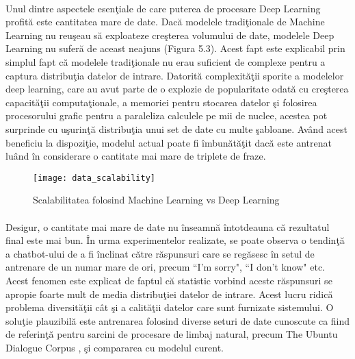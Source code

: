 \paragraph{}
Unul dintre aspectele esen\c tiale de care puterea de procesare Deep Learning profit\u a este cantitatea mare de date. Dac\u a modelele tradi\c tionale de Machine Learning nu reu\c seau s\u a exploateze cre\c sterea volumului de date, modelele Deep Learning nu sufer\u a de aceast neajuns (Figura 5.3). Acest fapt este explicabil prin simplul fapt c\u a modelele tradi\c tionale nu erau suficient de complexe pentru a captura distribu\c tia datelor de intrare. Datorit\u a complexit\u a\c tii sporite a modelelor deep learning, care au avut parte de o explozie de popularitate odat\u a cu cre\c sterea capacit\u a\c tii computa\c tionale, a memoriei pentru stocarea datelor \c si folosirea procesorului grafic pentru a paraleliza calculele pe mii de nuclee, acestea pot surprinde cu u\c surin\c t\u a distribu\c tia unui set de date cu multe \c sabloane. Av\^ and acest beneficiu la dispozi\c tie, modelul actual poate fi \^ imbun\u at\u a\c tit dac\u a este antrenat lu\^ and \^ in considerare o cantitate mai mare de triplete de fraze.

\begin{figure}[H]
\centering
\texttt{[image: data\_scalability]}
\caption{Scalabilitatea folosind Machine Learning vs Deep Learning}
\end{figure}

\paragraph{}
Desigur, o cantitate mai mare de date nu \^ inseamn\u a \^ intotdeauna c\u a rezultatul final este mai bun. \^ In urma experimentelor realizate, se poate observa o tendin\c t\u a a chatbot-ului de a fi \^ inclinat c\u atre r\u aspunsuri care se reg\u asesc \^ in setul de antrenare de un numar mare de ori, precum ``I'm sorry", ``I don't know" etc. Acest fenomen este explicat de faptul c\u a statistic vorbind aceste r\u aspunsuri se apropie foarte mult de media distribu\c tiei datelor de intrare. Acest lucru ridic\u a problema diversit\u a\c tii c\^ at \c si a calit\u a\c tii datelor care sunt furnizate sistemului. O solu\c tie plauzibil\u a este antrenarea folosind diverse seturi de date cunoscute ca fiind de referin\c t\u a pentru sarcini de procesare de limbaj natural, precum The Ubuntu Dialogue Corpus \cite{DBLP:journals/corr/LowePSP15}, \c si compararea cu modelul curent.




